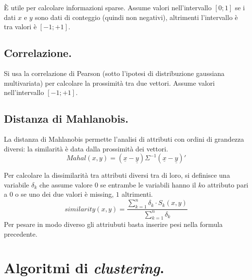 \documentclass[11pt, a4page, twocolumn]{article}
\begin{document}
È utile per calcolare informazioni sparse.
Assume valori nell'intervallo $[0;1]$ se i dati $x$ e $y$ sono dati di conteggio (quindi non negativi), altrimenti l'intervallo è tra valori è $[-1;+1]$.

\subsection{Correlazione.}
Si usa la correlazione di Pearson (sotto l'ipotesi di distribuzione gaussiana multivariata) per calcolare la prossimità tra due vettori.
Assume valori nell'intervallo $[-1;+1]$.

\subsection{Distanza di Mahlanobis.}
La distanza di Mahlanobis permette l'analisi di attributi con ordini di grandezza diversi: la similarità è data dalla prossimità dei vettori.
\begin{equation*}
Mahal(x, y) = (\underline{x} - \underline{y})\Sigma^{-1}(\underline{x} - \underline{y})'
\end{equation*}

Per calcolare la dissimilarità tra attributi diversi tra di loro, si definisce una variabile $\delta_k$ che assume valore $0$ se entrambe le variabili hanno il $k$o attributo pari a $0$ o se uno dei due valori è missing, $1$ altrimenti.
\begin{equation*}
similarity(x, y) = \frac{\sum^{n}_{k=1}{\delta_k \cdot S_k(x, y)}}{\sum^{n}_{k=1}{\delta_k}}
\end{equation*}
Per pesare in modo diverso gli attriubuti basta inserire pesi nella formula precedente.


\section{Algoritmi di \textit{clustering}.}
\end{document}
